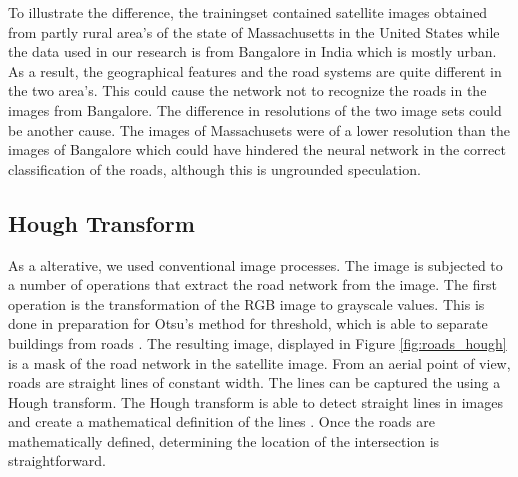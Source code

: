 To illustrate the difference, the trainingset contained satellite images
obtained from partly rural area's of the state of Massachusetts in the United
States while the data used in our research is from Bangalore in India which is
mostly urban.  As a result, the geographical features and the road systems are
quite different in the two area's. This could cause the network not to
recognize the roads in the images from Bangalore. The difference in resolutions
of the two image sets could be another cause. The images of Massachusets were
of a lower resolution than the images of Bangalore which could have hindered
the neural network in the correct classification of the roads, although this is
ungrounded speculation.

\subsection{Hough Transform}
As a alterative, we used conventional image processes. The image is subjected
to a number of operations that extract the road network from the image. The
first operation is the transformation of the RGB image to grayscale values.
This is done in preparation for Otsu's method for threshold, which is able to
separate buildings from roads \cite{otsu1979threshold}. The resulting image,
displayed in Figure \ref{fig:roads_hough} is a mask of the road network in the
satellite image. From an aerial point of view, roads are straight lines of
constant width. The lines can be captured the using a Hough transform. The
Hough transform is able to detect straight lines in images and create
a mathematical definition of the lines \cite{duda1972use}.  Once the roads are
mathematically defined, determining the location of the intersection is
straightforward.

